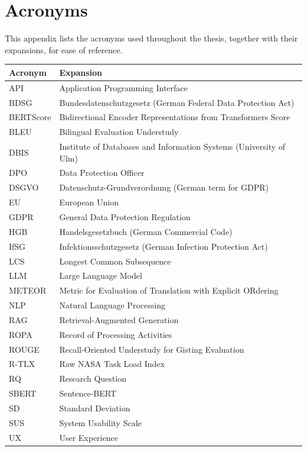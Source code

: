 \chapter{Acronyms}
\label{app:acronyms}

This appendix lists the acronyms used throughout the thesis,
together with their expansions, for ease of reference.

\begin{table}[htbp]
\centering
\begin{tabular}{@{}l l@{}}
\toprule
Acronym & Expansion \\
\midrule
API        & Application Programming Interface \\
BDSG       & Bundesdatenschutzgesetz (German Federal Data Protection Act) \\
BERTScore  & Bidirectional Encoder Representations from Transformers Score \\
BLEU       & Bilingual Evaluation Understudy \\
DBIS       & Institute of Databases and Information Systems (University of Ulm) \\
DPO        & Data Protection Officer \\
DSGVO      & Datenschutz-Grundverordnung (German term for GDPR) \\
EU         & European Union \\
GDPR       & General Data Protection Regulation \\
HGB        & Handelsgesetzbuch (German Commercial Code) \\
IfSG       & Infektionsschutzgesetz (German Infection Protection Act) \\
LCS        & Longest Common Subsequence \\
LLM        & Large Language Model \\
METEOR     & Metric for Evaluation of Translation with Explicit ORdering \\
NLP        & Natural Language Processing \\
RAG        & Retrieval-Augmented Generation \\
ROPA       & Record of Processing Activities \\
ROUGE      & Recall-Oriented Understudy for Gisting Evaluation \\
R-TLX      & Raw NASA Task Load Index \\
RQ         & Research Question \\
SBERT      & Sentence-BERT \\
SD         & Standard Deviation \\
SUS        & System Usability Scale \\
UX         & User Experience \\
\bottomrule
\end{tabular}
\end{table}
